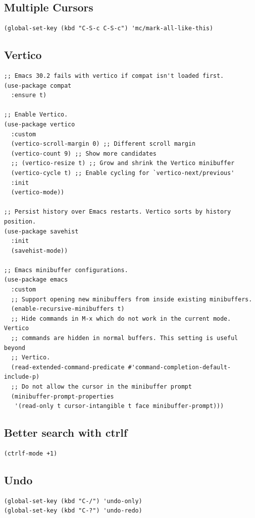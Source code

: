 \documentclass[10pt]{article}
\begin{document}
\subsection{Multiple Cursors}
\label{sec:orgea11252}
\begin{verbatim}
(global-set-key (kbd "C-S-c C-S-c") 'mc/mark-all-like-this)
\end{verbatim}
\subsection{Vertico}
\label{sec:orgaf65271}
\begin{verbatim}
;; Emacs 30.2 fails with vertico if compat isn't loaded first.
(use-package compat
  :ensure t)

;; Enable Vertico.
(use-package vertico
  :custom
  (vertico-scroll-margin 0) ;; Different scroll margin
  (vertico-count 9) ;; Show more candidates
  ;; (vertico-resize t) ;; Grow and shrink the Vertico minibuffer
  (vertico-cycle t) ;; Enable cycling for `vertico-next/previous'
  :init
  (vertico-mode))

;; Persist history over Emacs restarts. Vertico sorts by history position.
(use-package savehist
  :init
  (savehist-mode))

;; Emacs minibuffer configurations.
(use-package emacs
  :custom
  ;; Support opening new minibuffers from inside existing minibuffers.
  (enable-recursive-minibuffers t)
  ;; Hide commands in M-x which do not work in the current mode.  Vertico
  ;; commands are hidden in normal buffers. This setting is useful beyond
  ;; Vertico.
  (read-extended-command-predicate #'command-completion-default-include-p)
  ;; Do not allow the cursor in the minibuffer prompt
  (minibuffer-prompt-properties
   '(read-only t cursor-intangible t face minibuffer-prompt)))
\end{verbatim}
\subsection{Better search with ctrlf}
\label{sec:orgf115f79}
\begin{verbatim}
(ctrlf-mode +1)
\end{verbatim}
\subsection{Undo}
\label{sec:org6125a1e}
\begin{verbatim}
(global-set-key (kbd "C-/") 'undo-only)
(global-set-key (kbd "C-?") 'undo-redo)
\end{verbatim}
\end{document}
